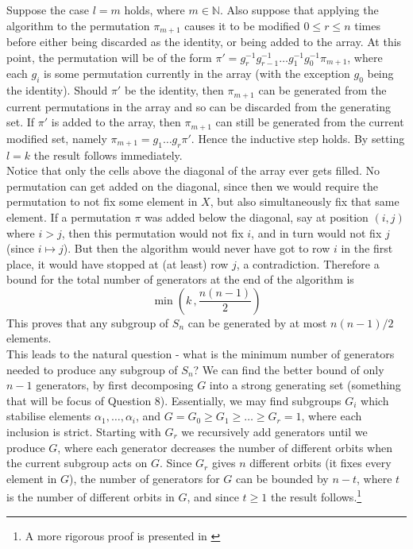 \documentclass[10pt,a4paper,notitlepage]{article}
\newcommand{\N}{\mathbb{N}}
\begin{document}
Suppose the case $l=m$ holds, where $m\in \N$. Also suppose that applying the algorithm to the permutation $\pi_{m+1}$ causes it to be modified $0\leq r\leq n$ times before either being discarded as the identity, or being added to the array. At this point, the permutation will be of the form $\pi'=g_{r}^{-1}g_{r-1}^{-1}\hdots g_{1}^{-1}g_{0}^{-1}\pi_{m+1}$, where each $g_{i}$ is some permutation currently in the array (with the exception $g_{0}$ being the identity). Should $\pi'$ be the identity, then $\pi_{m+1}$ can be generated from the current permutations in the array and so can be discarded from the generating set. If $\pi'$ is added to the array, then $\pi_{m+1}$ can still be generated from the current modified set, namely $\pi_{m+1}=g_{1}\hdots g_{r}\pi'$. Hence the inductive step holds. By setting $l=k$ the result follows immediately.\\

Notice that only the cells above the diagonal of the array ever gets filled. No permutation can get added on the diagonal, since then we would require the permutation to not fix some element in $X$, but also simultaneously fix that same element. If a permutation $\pi$ was added below the diagonal, say at position $(i,j)$ where $i>j$, then this permutation would not fix $i$, and in turn would not fix $j$ (since $i\mapsto j$). But then the algorithm would never have got to row $i$ in the first place, it would have stopped at (at least) row $j$, a contradiction. Therefore a bound for the total number of generators at the end of the algorithm is
\begin{equation}\label{eq:bound}
\min\left( k \, , \frac{n(n-1)}{2}\right)
\end{equation}
This proves that any subgroup of $S_{n}$ can be generated by at most $n(n-1)/2$ elements.\\

This leads to the natural question - what is the minimum number of generators needed to produce any subgroup of $S_{n}$? We can find the better bound of only $n-1$ generators, by first decomposing $G$ into a strong generating set (something that will be focus of Question 8). Essentially, we may find subgroups $G_{i}$ which stabilise elements $\alpha_{1},\hdots,\alpha_{i}$, and $G=G_{0}\geq G_{1}\geq\hdots \geq G_{r}=1$, where each inclusion is strict. Starting with $G_{r}$ we recursively add generators until we produce $G$, where each generator decreases the number of different orbits when the current subgroup acts on $G$. Since $G_{r}$ gives $n$ different orbits (it fixes every element in $G$), the number of generators for $G$ can be bounded by $n-t$, where $t$ is the number of different orbits in $G$, and since $t\geq 1$ the result follows.\footnote{A more rigorous proof is presented in \cite{JERRUM198660}}\\
\end{document}
